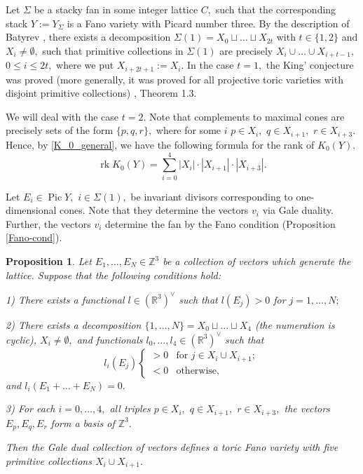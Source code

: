 \documentclass[11pt,leqno]{amsart}
\newtheorem{prop}[theo]{Proposition}
\numberwithin{equation}{section}
\def\R{\mathbb{R}}
\def\Z{\mathbb{Z}}
\newcommand{\Pic}{\operatorname{Pic}}
\newcommand{\rk}{\operatorname{rk}}
\begin{document}
Let $\Sigma$ be a stacky fan in some integer lattice $C,$ such that the corresponding stack
$Y:=Y_{\Sigma}$ is a Fano variety with Picard number three. By the description of Batyrev \cite{Ba}, there exists
a decomposition $\Sigma(1)=X_0\sqcup\dots\sqcup X_{2t}$ with $t\in \{1,2\}$ and $X_i\ne\emptyset,$ such
that primitive collections in $\Sigma(1)$ are precisely $X_i\cup\dots\cup X_{i+t-1},$ $0\leq i\leq 2t,$ where
we put $X_{i+2t+1}:=X_i.$ In the case $t=1,$ the King' conjecture was proved (more generally, it was proved for all projective toric varieties
with disjoint primitive collections) \cite{CM}, Theorem 1.3.

We will deal with the case $t=2.$ Note that complements to maximal cones are precisely sets of the form $\{p,q,r\},$ where for some $i$
$p\in X_i,$ $q\in X_{i+1},$ $r\in X_{i+3}.$ Hence, by \eqref{K_0_general}, we have the following formula for the rank of $K_0(Y).$
\begin{equation}\label{rk_K_0}\rk K_0(Y)=\sum\limits_{i=0}^4 |X_i|\cdot|X_{i+1}|\cdot|X_{i+3}|.\end{equation}



Let $E_i\in \Pic Y,$ $i\in \Sigma(1),$ be invariant divisors corresponding to one-dimensional cones. Note that they
determine the vectors $v_i$ via Gale duality. Further, the vectors $v_i$ determine the fan by the Fano condition (Proposition \ref{Fano-cond}).

\begin{prop}\label{descr_by_divisors}Let $E_1,\dots,E_N\in\Z^3$ be a collection of vectors which generate the lattice. Suppose that the following conditions hold:

1) There exists a functional $l\in \left(\R^3\right)^{\vee}$ such that $l\left(E_j\right)>0$ for $j=1,\dots,N;$

2) There exists a decomposition $\{1,\dots,N\}=X_0\sqcup\dots\sqcup X_4$ (the numeration is cyclic),
$X_i\ne\emptyset,$ and functionals $l_0,\dots,l_4\in \left(\R^3\right)^{\vee}$ such that
$$l_i\left(E_j\right)\begin{cases} >0 & \text{for }j\in X_i\cup X_{i+1};\\
<0 & \text{otherwise},\end{cases}$$
and $l_i\left(E_1+\dots+E_N\right)=0.$

3) For each $i=0,\dots,4,$ all triples $p\in X_i,$ $q\in X_{i+1},$ $r\in X_{i+3},$
the vectors $E_p, E_q, E_r$ form a basis of $\Z^3.$

Then the Gale dual collection of vectors defines
a toric Fano variety with five primitive collections $X_i\cup X_{i+1}.$\end{prop}
\end{document}
